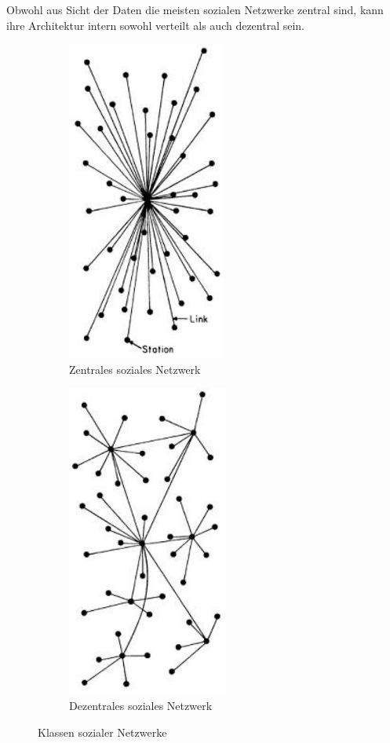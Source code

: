	Obwohl aus Sicht der Daten die meisten sozialen Netzwerke zentral sind, kann ihre Architektur intern sowohl verteilt als auch dezentral sein.\\
	\begin{figure}[h] 
		\label{fig:classes-of-networks}
		\centering
		\begin{subfigure}[t]{0.4\linewidth}
			\centering
			\includegraphics[width=0.4\linewidth]{figures/centralized-network.png}
			\caption{Zentrales soziales Netzwerk}
			\label{fig:central-network}
		\end{subfigure}
		\begin{subfigure}[t]{0.4\linewidth}
			\centering
			\includegraphics[width=0.4\linewidth]{figures/decentralized-network.png}
			\caption{Dezentrales soziales Netzwerk}
			\label{fig:decentral-network}
		\end{subfigure}
		\vspace{4pt}
		\caption{Klassen sozialer Netzwerke}
	\end{figure}~\\
